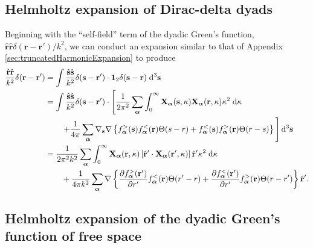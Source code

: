 \documentclass{article}
\begin{document}
\subsection{Helmholtz expansion of Dirac-delta dyads}\label{sec:diracDyadExpansion}

Beginning with the ``self-field'' term of the dyadic Green's function, $\hat{\mathbf{r}}\hat{\mathbf{r}}\delta(\mathbf{r} - \mathbf{r}')/k^2$, we can conduct an expansion similar to that of Appendix \ref{sec:truncatedHarmonicExpansion} to produce
\begin{equation}
\begin{split}
\frac{\hat{\mathbf{r}}\hat{\mathbf{r}}}{k^2}\delta(\mathbf{r} - \mathbf{r}') &= \int\frac{\hat{\mathbf{s}}\hat{\mathbf{s}}}{k^2}\delta(\mathbf{s} - \mathbf{r}')\cdot\bm{1}_2\delta(\mathbf{s} - \mathbf{r})\;\mathrm{d}^3\mathbf{s}\\
&= \int\frac{\hat{\mathbf{s}}\hat{\mathbf{s}}}{k^2}\delta(\mathbf{s} - \mathbf{r}')\cdot\left[\frac{1}{2\pi^2}\sum_{\bm{\alpha}}\int_0^\infty\mathbf{X}_{\bm{\alpha}}(\mathbf{s},\kappa)\mathbf{X}_{\bm{\alpha}}(\mathbf{r},\kappa)\kappa^2\;\mathrm{d}\kappa\right.\\
&\qquad\left.+\frac{1}{4\pi}\sum_{\bm{\alpha}}\nabla_{\mathbf{s}}\nabla\left\{f_{\bm{\alpha}}^>(\mathbf{s})f_{\bm{\alpha}}^<(\mathbf{r})\Theta(s - r) + f_{\bm{\alpha}}^<(\mathbf{s})f_{\bm{\alpha}}^>(\mathbf{r})\Theta(r - s)\right\} \vphantom{\int_0^\infty} \right]\mathrm{d}^3\mathbf{s}\\
&= \frac{1}{2\pi^2k^2}\sum_{\bm{\alpha}}\int_0^\infty\mathbf{X}_{\bm{\alpha}}(\mathbf{r},\kappa)\left[\hat{\mathbf{r}}'\cdot\mathbf{X}_{\bm{\alpha}}(\mathbf{r}',\kappa)\right]\hat{\mathbf{r}}'\kappa^2\;\mathrm{d}\kappa\\
&\qquad+\frac{1}{4\pi k^2}\sum_{\bm{\alpha}}\nabla\left\{\frac{\partial f_{\bm{\alpha}}^>(\mathbf{r}')}{\partial r'}f_{\bm{\alpha}}^<(\mathbf{r})\Theta(r' - r) + \frac{\partial f_{\bm{\alpha}}^<(\mathbf{r}')}{\partial r'}f_{\bm{\alpha}}^>(\mathbf{r})\Theta(r - r')\right\}\hat{\mathbf{r}}'.
\end{split}
\end{equation}







\subsection{Helmholtz expansion of the dyadic Green's function of free space}\label{sec:helmholtzDecompositionFreeSpaceGreenFunction}
\end{document}
